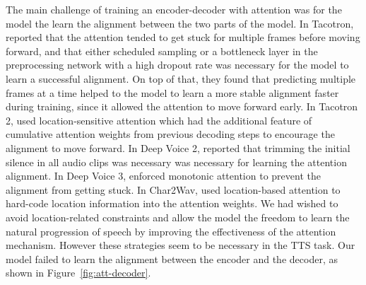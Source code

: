 \documentclass[11pt]{article}
\begin{document}
The main challenge of training an encoder-decoder with attention was for the model the learn the alignment
between the two parts of the model.
In Tacotron, \textcite{wang2017tacotron} reported that
the attention tended to get stuck for multiple frames before moving forward,
and that either scheduled sampling \parencite{bengio2015scheduled}
or a bottleneck layer in the preprocessing network with a high dropout rate
was necessary for the model to learn a successful alignment.
On top of that, they found that predicting multiple frames at a time
helped to the model to learn a more stable alignment faster during training,
since it allowed the attention to move forward early.
In Tacotron 2, \textcite{shen2018natural} used location-sensitive attention
\parencite{chorowski2015attention} which had the additional feature
of cumulative attention weights from previous decoding steps
to encourage the alignment to move forward.
In Deep Voice 2, \textcite{arik2017deep2} reported that trimming the initial
silence in all audio clips was necessary was necessary for learning
the attention alignment.
In Deep Voice 3, \textcite{ping2017deep} enforced monotonic attention
\parencite{raffel2017online} to prevent the alignment from getting stuck.
In Char2Wav, \textcite{sotelo2017char2wav} used location-based attention
\parencite{graves2013generating} to hard-code location information into
the attention weights.
We had wished to avoid location-related constraints and allow the model
the freedom to learn the natural progression of speech by improving
the effectiveness of the attention mechanism.
However these strategies seem to be necessary in the TTS task.
Our model failed to learn the alignment between the encoder and the decoder,
as shown in Figure~\ref{fig:att-decoder}.
\end{document}
